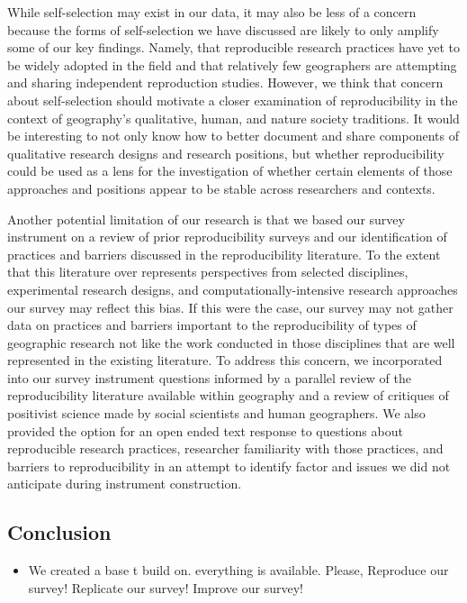 \documentclass[]{interact}
\theoremstyle{plain}%
\theoremstyle{definition}
\theoremstyle{remark}
\begin{document}
While self-selection may exist in our data, it may also be less of a concern because the forms of self-selection we have discussed are likely to only amplify some of our key findings. 
Namely, that reproducible research practices have yet to be widely adopted in the field and that relatively few geographers are attempting and sharing independent reproduction studies.
However, we think that concern about self-selection should motivate a closer examination of reproducibility in the context of geography's qualitative, human, and nature society traditions.  
It would be interesting to not only know how to better document and share components of qualitative research designs and research positions, but whether reproducibility could be used as a lens for the investigation of 
whether certain elements of those approaches and positions appear to be stable across researchers and contexts.

Another potential limitation of our research is that we based our survey instrument on a review of prior reproducibility surveys and our identification of practices and barriers discussed in the reproducibility literature. 
To the extent that this literature over represents perspectives from selected disciplines, experimental research designs, and computationally-intensive research approaches our survey may reflect this bias. 
If this were the case, our survey may not gather data on practices and barriers important to the reproducibility of types of geographic research not like the work conducted in those disciplines that are well represented in the existing literature. 
To address this concern, we incorporated into our survey instrument questions informed by a parallel review of the reproducibility literature available within geography and a review of critiques of positivist science made by social scientists and human geographers.
We also provided the option for an open ended text response to questions about reproducible research practices, researcher familiarity with those practices, and barriers to reproducibility in an attempt to identify factor and issues we did not anticipate during instrument construction.  

\subsection*{Conclusion}


\begin{itemize}
    \item We created a base t build on. everything is available. Please, Reproduce our survey! Replicate our survey! Improve our survey!
\end{itemize}
\end{document}
